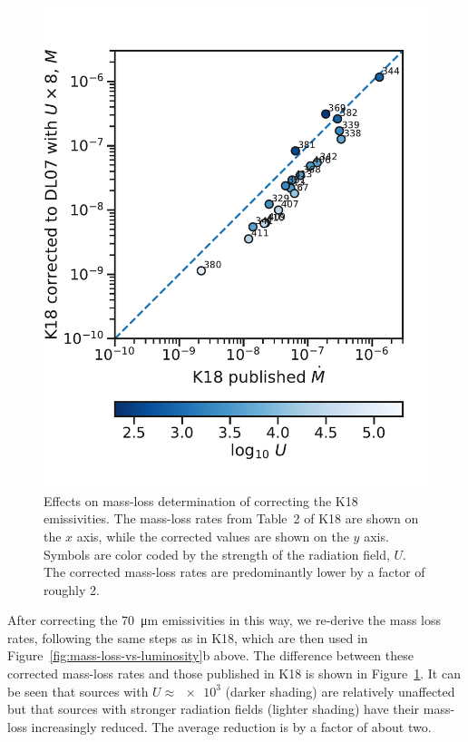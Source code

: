 \begin{figure}
  \centering
  \includegraphics[width=\linewidth]{figs/K18-mdot-Ux8-comparison}
  \caption{Effects on mass-loss determination of correcting the K18
    emissivities.  The mass-loss rates from Table~2 of K18 are shown
    on the \(x\) axis, while the corrected values are shown on the
    \(y\) axis.  Symbols are color coded by the strength of the
    radiation field, \(U\). The corrected mass-loss rates are
    predominantly lower by a factor of roughly 2.}
  \label{fig:k18-mdot-corrected-emissivity}
\end{figure}

After correcting the \SI{70}{\um} emissivities in this way, we
re-derive the mass loss rates, following the same steps as in K18,
which are then used in Figure~\ref{fig:mass-loss-vs-luminosity}b
above.  The difference between these corrected mass-loss rates and
those published in K18 is shown in
Figure~\ref{fig:k18-mdot-corrected-emissivity}.  It can be seen that
sources with \(U \approx \num{e3}\) (darker shading) are relatively
unaffected but that sources with stronger radiation fields (lighter
shading) have their mass-loss increasingly reduced.
The average reduction is by a factor of about two.


